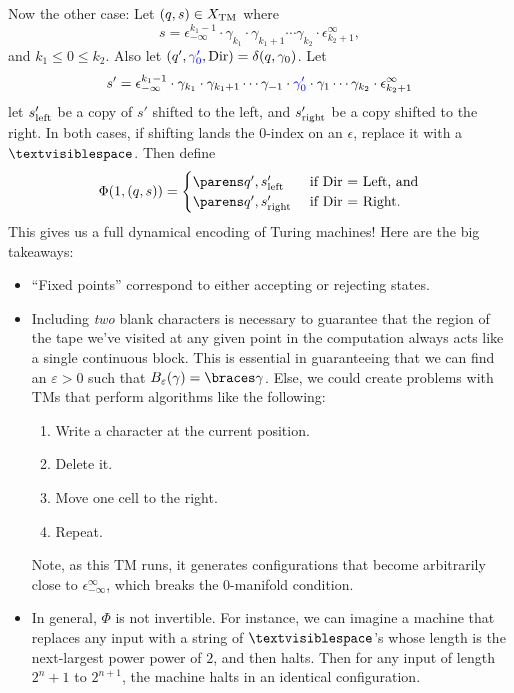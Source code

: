 \documentclass{fkpaper}
\newcommand{\blank}{\textvisiblespace}
\begin{document}
\begin{multicols}{2}
  Now the other case: Let $(q, s) \in X_{\rm TM}$ where
  \[
    s = \epsilon_{-\infty}^{k_1-1} \cdot \gamma_{k_1} \cdot \gamma_{k_1
      + 1} \cdots \gamma_{k_2} \cdot \epsilon_{k_2+1}^\infty,
  \]
  and $k_1 \leq 0 \leq k_2$. Also let $(q', {\color{blue} \gamma'_0},
  {\mathrm{Dir}}) = \delta(q, \gamma_0)$. Let
  \[
    s' = \epsilon_{-\infty}^{k_1 - 1} \cdot \gamma_{k_1} \cdot
    \gamma_{k_1 + 1} \cdots \gamma_{-1} \cdot {\color{blue} \gamma'_0}
    \cdot \gamma_1 \cdots \gamma_{k_2} \cdot \epsilon_{k_2+1}^\infty
  \]
  let $s'_{\rm left}$ be a copy of $s'$ shifted to the left, and
  $s'_{\rm right}$ be a copy shifted to the right. In both cases, if
  shifting lands the $0$-index on an $\epsilon$, replace it with a
  $\blank$. Then define
  \[
    \Phi(1, (q, s)) =
    \begin{cases}
      \pn{q', s'_{\rm left}} & \text{ if Dir $ = $ Left, and}\\
      \pn{q', s'_{\rm right}} & \text{ if Dir $ = $ Right}.
    \end{cases}
  \]
  This gives us a full dynamical encoding of Turing machines! Here are
  the big takeaways:
  \begin{itemize}
    \item ``Fixed points'' correspond to either accepting or rejecting
      states.
    \item Including \emph{two} blank characters is necessary to
      guarantee that the region of the tape we've visited at any given
      point in the computation always acts like a single continuous
      block. This is essential in guaranteeing that we can find an
      $\varepsilon > 0$ such that $B_\varepsilon(\gamma) =
      \set{\gamma}$. Else, we could create problems with
      TMs that perform algorithms like the following:
      \begin{enumerate}
        \item Write a character at the current position.
        \item Delete it.
        \item Move one cell to the right.
        \item Repeat.
      \end{enumerate}
      Note, as this TM runs, it generates configurations that become
      arbitrarily close to $\epsilon_{-\infty}^\infty$, which breaks
      the $0$-manifold condition.
    \item In general, $\Phi$ is not invertible. For instance, we can
      imagine a machine that replaces any input with a string of
      $\blank$'s whose length is the next-largest power power of $2$,
      and then halts. Then for any input of length $2^n + 1$ to
      $2^{n+1}$, the machine halts in an identical configuration.
  \end{itemize}


\end{multicols}
\end{document}
